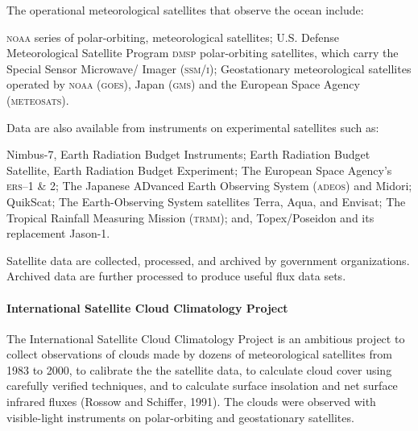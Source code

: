 The operational meteorological satellites that observe the ocean
include:
\begin{enumerate}
\vitem \textsc{noaa} series of polar-orbiting, meteorological satellites;
\vitem U.S. Defense Meteorological Satellite Program \textsc{dmsp} polar-orbiting
satellites, which carry the Special Sensor Microwave/ Imager \textsc{(ssm/i)};
\vitem Geostationary meteorological satellites operated by \textsc{noaa}
(\textsc{goes}), Japan (\textsc{gms}) and the European Space Agency
(\textsc{meteosats}).
\end{enumerate}
Data are also available from instruments on experimental satellites such
as:
\begin{enumerate}
\vitem Nimbus-7, Earth Radiation Budget Instruments;
\vitem Earth Radiation Budget Satellite, Earth Radiation Budget Experiment;
\vitem The European Space Agency's \textsc{ers}--1 \& 2;
\vitem The Japanese ADvanced Earth Observing System (\textsc{adeos}) and Midori;
\vitem QuikScat;
\vitem The Earth-Observing System satellites Terra, Aqua, and Envisat;
\vitem The Tropical Rainfall Measuring Mission (\textsc{trmm}); and,
\vitem Topex/Poseidon and its replacement Jason-1.
\end{enumerate}

Satellite data are collected, processed, and archived by government
organizations. Archived data are further processed to produce useful
flux data sets.

\paragraph{International Satellite Cloud Climatology Project}
The
International Sat\-ellite Cloud Climatology Project is an ambitious
project to collect observations of clouds made by dozens of
meteorological satellites from 1983 to 2000, to calibrate the the
satellite data, to calculate cloud cover using carefully verified
techniques, and to calculate surface
insolation and net surface infrared
fluxes (Rossow and Schiffer, 1991). The clouds were observed with
visible-light instruments on polar-orbiting and geostationary
satellites.

